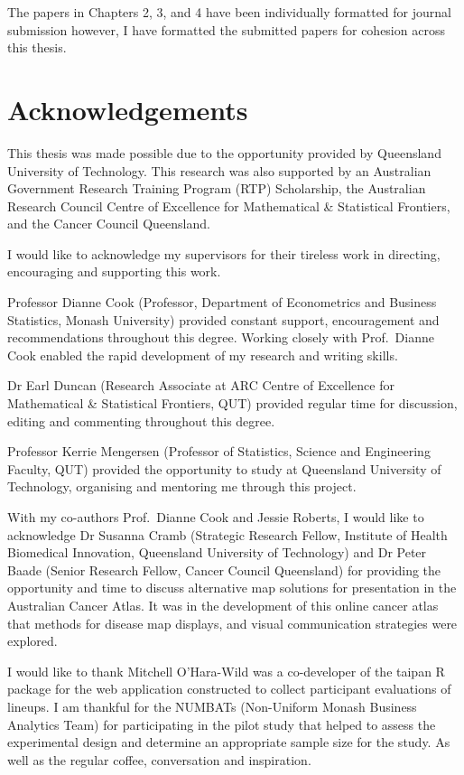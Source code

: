 \documentclass{monashthesis}
\begin{document}
The papers in Chapters 2, 3, and 4 have been individually formatted for journal submission however, I have formatted the submitted papers for cohesion across this thesis.

\hypertarget{acknowledgements}{%
\chapter*{Acknowledgements}\label{acknowledgements}}

This thesis was made possible due to the opportunity provided by Queensland University of Technology.
This research was also supported by an Australian Government Research Training Program (RTP) Scholarship, the Australian Research Council Centre of Excellence for Mathematical \& Statistical Frontiers, and the Cancer Council Queensland.

I would like to acknowledge my supervisors for their tireless work in directing, encouraging and supporting this work.

Professor Dianne Cook (Professor, Department of Econometrics and Business Statistics, Monash University) provided constant support, encouragement and recommendations throughout this degree. Working closely with Prof.~Dianne Cook enabled the rapid development of my research and writing skills.

Dr Earl Duncan (Research Associate at ARC Centre of Excellence for Mathematical \& Statistical Frontiers, QUT) provided regular time for discussion, editing and commenting throughout this degree.

Professor Kerrie Mengersen (Professor of Statistics, Science and Engineering Faculty, QUT) provided the opportunity to study at Queensland University of Technology, organising and mentoring me through this project.

With my co-authors Prof.~Dianne Cook and Jessie Roberts, I would like to acknowledge Dr Susanna Cramb (Strategic Research Fellow, Institute of Health Biomedical Innovation, Queensland University of Technology) and Dr Peter Baade (Senior Research Fellow, Cancer Council Queensland) for providing the opportunity and time to discuss alternative map solutions for presentation in the Australian Cancer Atlas.
It was in the development of this online cancer atlas that methods for disease map displays, and visual communication strategies were explored.

I would like to thank Mitchell O'Hara-Wild was a co-developer of the taipan \autocite{taipan} R package for the web application constructed to collect participant evaluations of lineups.
I am thankful for the NUMBATs (Non-Uniform Monash Business Analytics Team) for participating in the pilot study that helped to assess the experimental design and determine an appropriate sample size for the study. As well as the regular coffee, conversation and inspiration.
\end{document}
